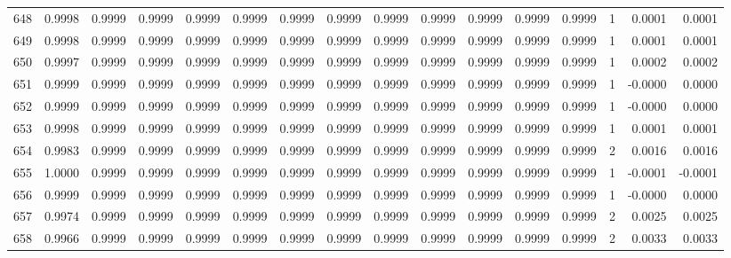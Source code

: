 \begin{tabular}{lrrrrrrrrrrrrrrr}
648 &      0.9998 &  0.9999 &  0.9999 &  0.9999 &  0.9999 &  0.9999 &  0.9999 &  0.9999 &  0.9999 &  0.9999 &   0.9999 &     0.9999 &      1 &                    0.0001 &                     0.0001 \\
649 &      0.9998 &  0.9999 &  0.9999 &  0.9999 &  0.9999 &  0.9999 &  0.9999 &  0.9999 &  0.9999 &  0.9999 &   0.9999 &     0.9999 &      1 &                    0.0001 &                     0.0001 \\
650 &      0.9997 &  0.9999 &  0.9999 &  0.9999 &  0.9999 &  0.9999 &  0.9999 &  0.9999 &  0.9999 &  0.9999 &   0.9999 &     0.9999 &      1 &                    0.0002 &                     0.0002 \\
651 &      0.9999 &  0.9999 &  0.9999 &  0.9999 &  0.9999 &  0.9999 &  0.9999 &  0.9999 &  0.9999 &  0.9999 &   0.9999 &     0.9999 &      1 &                   -0.0000 &                     0.0000 \\
652 &      0.9999 &  0.9999 &  0.9999 &  0.9999 &  0.9999 &  0.9999 &  0.9999 &  0.9999 &  0.9999 &  0.9999 &   0.9999 &     0.9999 &      1 &                   -0.0000 &                     0.0000 \\
653 &      0.9998 &  0.9999 &  0.9999 &  0.9999 &  0.9999 &  0.9999 &  0.9999 &  0.9999 &  0.9999 &  0.9999 &   0.9999 &     0.9999 &      1 &                    0.0001 &                     0.0001 \\
654 &      0.9983 &  0.9999 &  0.9999 &  0.9999 &  0.9999 &  0.9999 &  0.9999 &  0.9999 &  0.9999 &  0.9999 &   0.9999 &     0.9999 &      2 &                    0.0016 &                     0.0016 \\
655 &      1.0000 &  0.9999 &  0.9999 &  0.9999 &  0.9999 &  0.9999 &  0.9999 &  0.9999 &  0.9999 &  0.9999 &   0.9999 &     0.9999 &      1 &                   -0.0001 &                    -0.0001 \\
656 &      0.9999 &  0.9999 &  0.9999 &  0.9999 &  0.9999 &  0.9999 &  0.9999 &  0.9999 &  0.9999 &  0.9999 &   0.9999 &     0.9999 &      1 &                   -0.0000 &                     0.0000 \\
657 &      0.9974 &  0.9999 &  0.9999 &  0.9999 &  0.9999 &  0.9999 &  0.9999 &  0.9999 &  0.9999 &  0.9999 &   0.9999 &     0.9999 &      2 &                    0.0025 &                     0.0025 \\
658 &      0.9966 &  0.9999 &  0.9999 &  0.9999 &  0.9999 &  0.9999 &  0.9999 &  0.9999 &  0.9999 &  0.9999 &   0.9999 &     0.9999 &      2 &                    0.0033 &                     0.0033 \\

\end{tabular}
